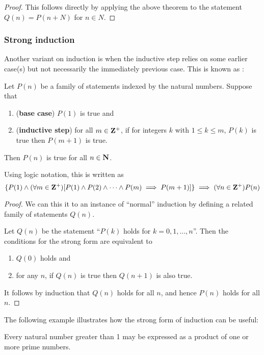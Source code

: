 \begin{proof}
This follows directly by applying the above theorem to the statement $Q(n) = P(n+N)$ for $n \in N$.
\end{proof}

\subsubsection{Strong induction}
Another variant on induction is when the inductive step relies on some earlier case(s) but not necessarily the immediately previous case. This is known as :

\begin{theorem}
Let $P(n)$ be a family of statements indexed by the natural numbers. Suppose that
\begin{enumerate}[label=(\roman*)]
\item (\textbf{base case}) $P(1)$ is true and
\item (\textbf{inductive step}) for all $m \in \mathbf Z^+$, if for integers $k$ with $1 \le k \le m$, $P(k)$ is true then $P(m+1)$ is true.
\end{enumerate}
Then $P(n)$ is true for all $n \in \mathbf N$.
\end{theorem}

Using logic notation, this is written as
\[ \{P(1) \land (\forall m \in \mathbf Z^+) [P(1) \land P(2) \land \cdots \land P(m) \implies P(m+1)]\} \implies (\forall n \in \mathbf Z^+)P(n) \]

\begin{proof}
We can this it to an instance of ``normal'' induction by defining a related family of statements $Q(n)$. 

Let $Q(n)$ be the statement ``$P(k)$ holds for $k=0,1,\dots,n$''. Then the conditions for the strong form are equivalent to 
\begin{enumerate}[label=(\roman*)]
\item $Q(0)$ holds and 
\item for any $n$, if $Q(n)$ is true then $Q(n+1)$ is also true.
\end{enumerate}
It follows by induction that $Q(n)$ holds for all $n$, and hence $P(n)$ holds for all $n$.
\end{proof}

The following example illustrates how the strong form of induction can be useful:

\begin{example}
Every natural number greater than 1 may be expressed as a product of one or more prime numbers.
\end{example}

